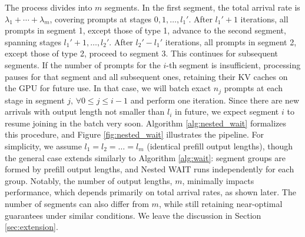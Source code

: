 The process divides into \( m \) segments. In the first segment, the total arrival rate is \( \lambda_1 + \cdots + \lambda_m \), covering prompts at stages \( 0, 1, \dots, l_1' \). After \( l_1' + 1 \) iterations, all prompts in segment 1, except those of type 1, advance to the second segment, spanning stages \( l_1' + 1, \dots, l_2' \). After \( l_2' - l_1' \) iterations, all prompts in segment 2, except those of type 2, proceed to segment 3. This continues for subsequent segments. If the number of prompts for the \( i \)-th segment is insufficient, processing pauses for that segment and all subsequent ones, retaining their KV caches on the GPU for future use. In that case, we will batch exact $n_j$ prompts at each stage in segment $j,\,\forall 0\le j\le i-1$ and perform one iteration. Since there are new arrivals with output length not smaller than $l_i$ in future, we expect segment $i$ to resume joining in the batch very soon. Algorithm \ref{alg:nested_wait} formalizes this procedure, and Figure \ref{fig:nested_wait} illustrates the pipeline. For simplicity, we assume \( l_1 = l_2 = \dots = l_m \) (identical prefill output lengths), though the general case extends similarly to Algorithm \ref{alg:wait}: segment groups are formed by prefill output lengths, and Nested WAIT runs independently for each group. Notably, the number of output lengths, \( m \), minimally impacts performance, which depends primarily on total arrival rates, as shown later. The number of segments can also differ from \( m \), while still retaining near-optimal guarantees under similar conditions. We leave the discussion in Section \ref{sec:extension}.

